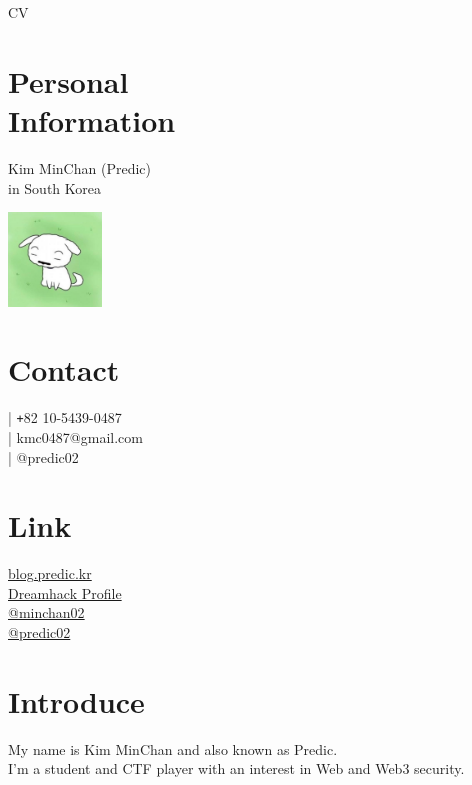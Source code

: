 \documentclass[margin,line]{resume}
\begin{document}
{\sc \Large CV}
\begin{resume}

\begin{minipage}{0.75\textwidth}
  \section{\mysidestyle Personal\\Information}
  Kim MinChan (Predic) \\
  in South Korea
\end{minipage}
\hfill
\begin{minipage}{0.2\textwidth}
  \begin{flushright}
    \includegraphics[width=2.5cm]{profile_image.jpg}
  \end{flushright}
\end{minipage}

    \section{\mysidestyle Contact}
    \faPhone  \space | \texttt{+}82 10-5439-0487 \\
    \faEnvelope  \space | kmc0487@gmail.com \\
     | @predic02

    \section{\mysidestyle Link}
    \faLink  \space \href{https://blog.predic.kr}{blog.predic.kr} \\
    \faLink  \space \href{https://dreamhack.io/users/17504}{Dreamhack Profile} \\
    \faGithub  \space \href{https://github.com/minchan02}{@minchan02} \\
    \faTwitter \space \href{https://x.com/predic02}{@predic02} 
   

    \section{\mysidestyle Introduce}
    My name is Kim MinChan and also known as Predic. \\
    I’m a student and CTF player with an interest in Web and Web3 security.
 

\end{resume}
\end{document}

